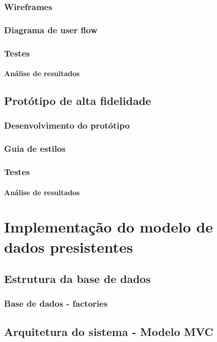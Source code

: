 \documentclass[11pt, twoside]{report}
\begin{document}
	\subsection{Wireframes}
	\subsection{Diagrama de user flow}
	\subsection{Testes}
	\subsubsection{Análise de resultados}
	
	\section{Protótipo de alta fidelidade}
	\subsection{Desenvolvimento do protótipo}
	\subsection{Guia de estilos}
	\subsection{Testes}
	\subsubsection{Análise de resultados}
	
	\chapter{Implementação do modelo de dados presistentes}
	\section{Estrutura da base de dados}
	\subsection{Base de dados - factories}
	\section{Arquitetura do sistema - Modelo MVC}
\end{document}
